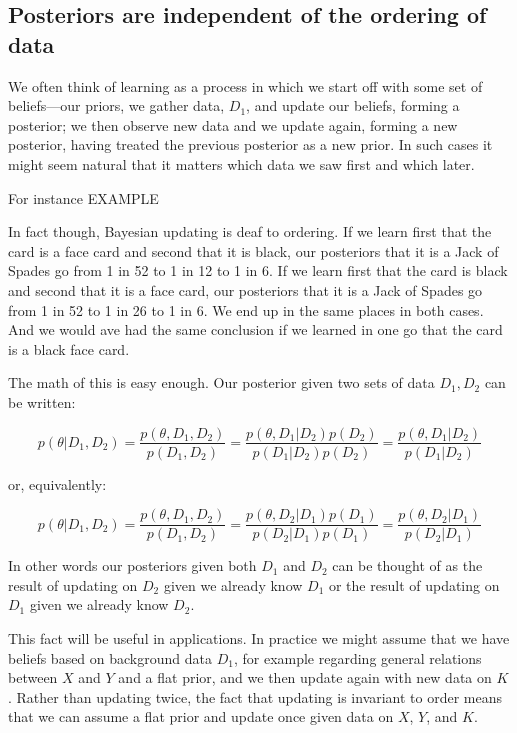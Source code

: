 \documentclass[
  12pt,
]{book}
\begin{document}
\hypertarget{posteriors-are-independent-of-the-ordering-of-data}{%
\subsection{Posteriors are independent of the ordering of data}\label{posteriors-are-independent-of-the-ordering-of-data}}

We often think of learning as a process in which we start off with some set of beliefs---our priors, we gather data, \(D_1\), and update our beliefs, forming a posterior; we then observe new data and we update again, forming a new posterior, having treated the previous posterior as a new prior. In such cases it might seem natural that it matters which data we saw first and which later.

For instance EXAMPLE

In fact though, Bayesian updating is deaf to ordering. If we learn first that the card is a face card and second that it is black, our posteriors that it is a Jack of Spades go from 1 in 52 to 1 in 12 to 1 in 6. If we learn first that the card is black and second that it is a face card, our posteriors that it is a Jack of Spades go from 1 in 52 to 1 in 26 to 1 in 6. We end up in the same places in both cases. And we would ave had the same conclusion if we learned in one go that the card is a black face card.

The math of this is easy enough. Our posterior given two sets of data \(D_1, D_2\) can be written:

\[p(\theta | D_1, D_2) = \frac{p(\theta, D_1, D_2)}{p(D_1, D_2)} = \frac{p(\theta, D_1 | D_2)p(D_2)}{p(D_1 | D_2)p(D_2)}= \frac{p(\theta, D_1 | D_2)}{p(D_1 | D_2)}\]

or, equivalently:

\[p(\theta | D_1, D_2) = \frac{p(\theta, D_1, D_2)}{p(D_1, D_2)} = \frac{p(\theta, D_2 | D_1)p(D_1)}{p(D_2 | D_1)p(D_1)}= \frac{p(\theta, D_2 | D_1)}{p(D_2 | D_1)}\]

In other words our posteriors given both \(D_1\) and \(D_2\) can be thought of as the result of updating on \(D_2\) given we already know \(D_1\) or the result of updating on \(D_1\) given we already know \(D_2\).

This fact will be useful in applications. In practice we might assume that we have beliefs based on background data \(D_1\), for example regarding general relations between \(X\) and \(Y\) and a flat prior, and we then update again with new data on \(K\). Rather than updating twice, the fact that updating is invariant to order means that we can assume a flat prior and update once given data on \(X\), \(Y\), and \(K\).
\end{document}
